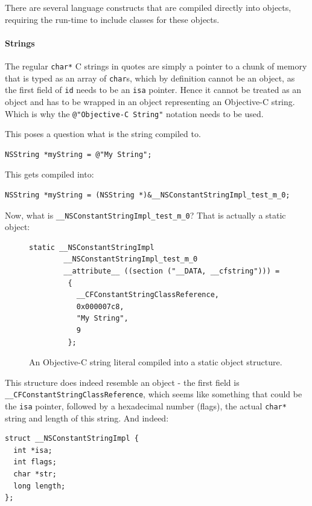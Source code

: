 There are several language constructs that are compiled directly into objects, requiring the run-time to include classes for these objects.

\paragraph{Strings} The regular \verb=char*= C strings in quotes are simply a pointer to a chunk of memory that is typed as an array of \verb=char=s, which by definition cannot be an object, as the first field of \verb=id= needs to be an \verb=isa= pointer. Hence it cannot be treated as an object and has to be wrapped in an object representing an Objective-C string. Which is why the \verb=@"Objective-C String"= notation needs to be used.

This poses a question what is the string compiled to.

\begin{verbatim}
NSString *myString = @"My String";
\end{verbatim}

This gets compiled into:

\begin{verbatim}
NSString *myString = (NSString *)&__NSConstantStringImpl_test_m_0;
\end{verbatim}

Now, what is \verb=__NSConstantStringImpl_test_m_0=? That is actually a static object:

\begin{figure}[H]
\begin{verbatim}
static __NSConstantStringImpl 
        __NSConstantStringImpl_test_m_0 
        __attribute__ ((section ("__DATA, __cfstring"))) = 
         {
           __CFConstantStringClassReference,
           0x000007c8,
           "My String",
           9
         };
\end{verbatim}
  \centering{}
  \caption{An Objective-C string literal compiled into a static object structure.}
  \label{fig:NSString_compiled}
\end{figure}

This structure does indeed resemble an object - the first field is \newline{}\verb=__CFConstantStringClassReference=, which seems like something that could be the \verb=isa= pointer, followed by a hexadecimal number (flags), the actual \verb=char*= string and length of this string. And indeed:

\begin{verbatim}
struct __NSConstantStringImpl {
  int *isa;
  int flags;
  char *str;
  long length;
};
\end{verbatim}

